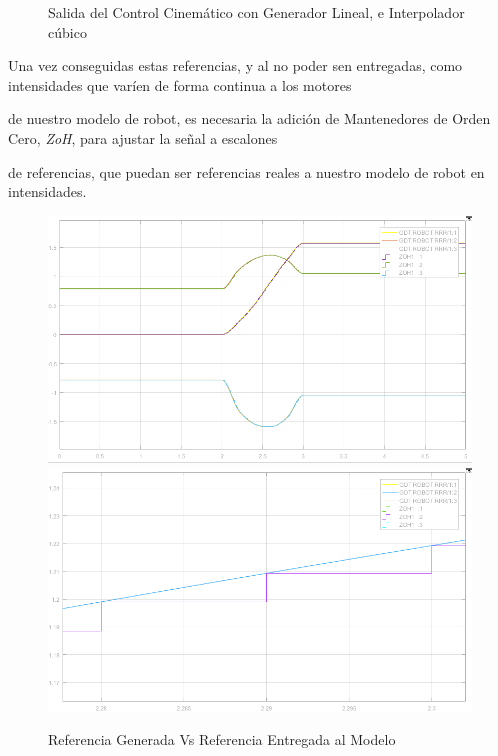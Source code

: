 \begin{itemize}
\begin{figure}[h!]
	\caption{Salida del Control Cinemático con Generador Lineal, e Interpolador cúbico}
	
\end{figure}



Una vez conseguidas estas referencias, y al no poder sen entregadas, como intensidades que varíen de forma continua a los motores

de nuestro modelo de robot, es necesaria la adición de Mantenedores de Orden Cero, \textit{ZoH}, para ajustar la señal a escalones

de referencias, que puedan ser referencias reales a nuestro modelo de robot en intensidades.





\begin{figure}[h!]
	
	\centering
	
	\includegraphics[width=.45\textwidth]{ZoHComparativa} \hspace{0.05cm} \includegraphics[width=.45\textwidth]{ZoHComparativaDetalle}
	
	\caption{Referencia Generada Vs Referencia Entregada al Modelo}
	
\end{figure}









\end{itemize}